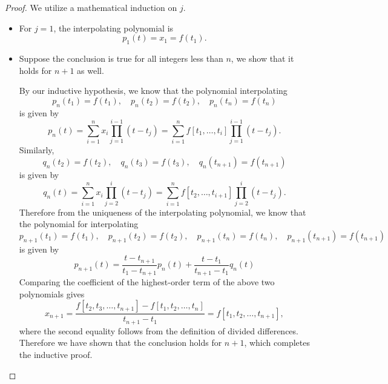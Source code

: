 \documentclass[a4paper]{book}
\numberwithin{equation}{chapter}
\theoremstyle{definition}
\begin{document}
  \begin{proof}
    We utilize a mathematical induction on $j$.
    \begin{itemize}
    \item
      For $j=1$, the interpolating polynomial is
      \begin{displaymath}
        p_1(t) = x_1 = f(t_1).
      \end{displaymath}
  
    \item
      Suppose the conclusion is true for all integers less than $n$,
      we show that it holds for $n+1$ as well.
      
      By our inductive hypothesis, we know that
      the polynomial interpolating
      \begin{displaymath}
        p_n(t_1) = f(t_1), \quad p_n(t_2) = f(t_2), \quad p_n(t_n) = f(t_n)
      \end{displaymath}
      is given by
      \begin{displaymath}
        p_n(t) = \sum_{i=1}^nx_i\prod_{j=1}^{i-1}(t-t_j)
        = \sum_{i=1}^nf[t_1, \ldots, t_i]\prod_{j=1}^{i-1}(t-t_j).
      \end{displaymath}
      Similarly,
      \begin{displaymath}
        q_n(t_2) = f(t_2), \quad q_n(t_3) = f(t_3), \quad q_n(t_{n+1}) = f(t_{n+1})
      \end{displaymath}
      is given by
      \begin{displaymath}
        q_n(t) = \sum_{i=1}^nx_i\prod_{j=2}^i(t-t_j)
        = \sum_{i=1}^nf[t_2, \ldots, t_{i+1}]\prod_{j=2}^i(t-t_j).
      \end{displaymath}
      Therefore from the uniqueness of the interpolating polynomial,
      we know that the polynomial for interpolating
      \begin{displaymath}
        p_{n+1}(t_1) = f(t_1), \quad p_{n+1}(t_2) = f(t_2), \quad
        p_{n+1}(t_n) = f(t_n), \quad p_{n+1}(t_{n+1}) = f(t_{n+1})
      \end{displaymath}
      is given by
      \begin{displaymath}
        p_{n+1}(t) = \frac{t-t_{n+1}}{t_1-t_{n+1}}p_n(t)
        + \frac{t-t_1}{t_{n+1}-t_1}q_n(t)
      \end{displaymath}
      Comparing the coefficient of the highest-order term of the above
      two polynomials gives
      \begin{displaymath}
        x_{n+1} = \frac{f[t_2, t_3, \ldots, t_{n+1}]-f[t_1, t_2, \ldots,
          t_n]}{t_{n+1} - t_1} = f[t_1, t_2, \ldots, t_{n+1}],
      \end{displaymath}
      where the second equality follows from the definition of divided differences.
      Therefore we have shown that the conclusion holds for $n+1$,
      which completes the inductive proof.
    \end{itemize}
  \end{proof}
\end{document}
